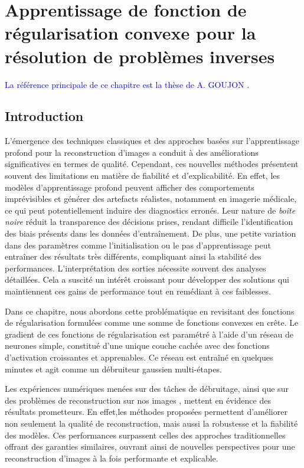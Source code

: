 \documentclass[a4paper, 12pt]{report} %
\newcommand{\modif}[1]{\textcolor{blue}{#1}}
\begin{document}
\newpage

\chapter{Apprentissage de fonction de régularisation convexe pour la résolution de problèmes inverses}
\modif{La référence principale de ce chapitre est la thèse de A. GOUJON \cite{goujon2024towards}.}

\section*{Introduction}

L’émergence des techniques classiques et des approches basées sur l’apprentissage profond pour la reconstruction d’images a conduit à des améliorations significatives en termes de qualité. Cependant, ces nouvelles méthodes présentent souvent des limitations en matière de fiabilité et d’explicabilité. En effet, les modèles d’apprentissage profond peuvent afficher des comportements imprévisibles et générer des artefacts réalistes, notamment en imagerie médicale, ce qui peut potentiellement induire des diagnostics erronés. Leur nature de \textit{boîte noire} réduit la transparence des décisions prises, rendant difficile l’identification des biais présents dans les données d’entraînement. De plus, une petite variation dans des paramètres comme l’initialisation ou le pas d’apprentissage peut entraîner des résultats très différents, compliquant ainsi la stabilité des performances. L’interprétation des sorties nécessite souvent des analyses détaillées. Cela a suscité un intérêt croissant pour développer des solutions qui maintiennent ces gains de performance tout en remédiant à ces faiblesses.

Dans ce chapitre, nous abordons cette problématique en revisitant des fonctions de régularisation formulées comme une somme de fonctions convexes en crête. Le gradient de ces fonctions de régularisation est paramétré à l’aide d’un réseau de neurones simple, constitué d’une unique couche cachée avec des fonctions d’activation croissantes et apprenables. Ce réseau est entraîné en quelques minutes et agit comme un débruiteur gaussien multi-étapes.

Les expériences numériques menées sur des tâches de débruitage, ainsi que sur des problèmes de reconstruction sur nos images   , mettent en évidence des résultats prometteurs. En effet,les méthodes proposées permettent d’améliorer non seulement la qualité de reconstruction, mais aussi la robustesse et la fiabilité des modèles. Ces performances surpassent celles des approches traditionnelles offrant des garanties similaires, ouvrant ainsi de nouvelles perspectives pour une reconstruction d’images à la fois performante et explicable.
\end{document}
